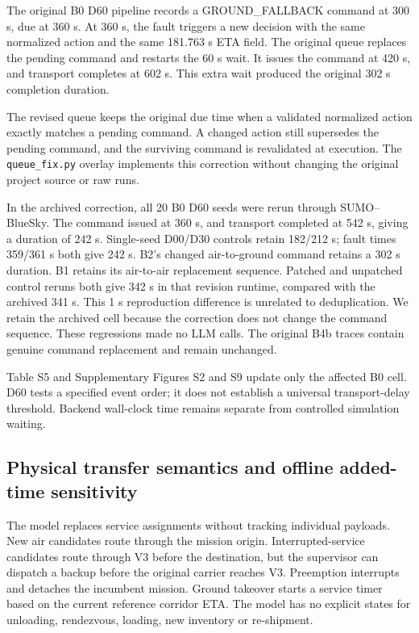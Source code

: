 \documentclass[11pt,a4paper]{article}
\begin{document}
The original B0 D60 pipeline records a GROUND\_FALLBACK command at 300 s, due at 360 s. At 360 s, the fault triggers a new decision with the same normalized action and the same 181.763 s ETA field. The original queue replaces the pending command and restarts the 60 s wait. It issues the command at 420 s, and transport completes at 602 s. This extra wait produced the original 302 s completion duration.

The revised queue keeps the original due time when a validated normalized action exactly matches a pending command. A changed action still supersedes the pending command, and the surviving command is revalidated at execution. The \nolinkurl{queue_fix.py} overlay implements this correction without changing the original project source or raw runs.

In the archived correction, all 20 B0 D60 seeds were rerun through SUMO--BlueSky. The command issued at 360 s, and transport completed at 542 s, giving a duration of 242 s. Single-seed D00/D30 controls retain 182/212 s; fault times 359/361 s both give 242 s. B2's changed air-to-ground command retains a 302 s duration. B1 retains its air-to-air replacement sequence. Patched and unpatched control reruns both give 342 s in that revision runtime, compared with the archived 341 s. This 1 s reproduction difference is unrelated to deduplication. We retain the archived cell because the correction does not change the command sequence. These regressions made no LLM calls. The original B4b traces contain genuine command replacement and remain unchanged.

Table S5 and Supplementary Figures S2 and S9 update only the affected B0 cell. D60 tests a specified event order; it does not establish a universal transport-delay threshold. Backend wall-clock time remains separate from controlled simulation waiting.

\subsection{Physical transfer semantics and offline added-time sensitivity}

The model replaces service assignments without tracking individual payloads. New air candidates route through the mission origin. Interrupted-service candidates route through V3 before the destination, but the supervisor can dispatch a backup before the original carrier reaches V3. Preemption interrupts and detaches the incumbent mission. Ground takeover starts a service timer based on the current reference corridor ETA. The model has no explicit states for unloading, rendezvous, loading, new inventory or re-shipment.
\end{document}
